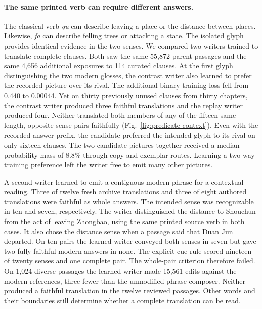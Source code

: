\paragraph{The same printed verb can require different answers.}
The classical verb \emph{qu} can describe leaving a place or the distance between places. Likewise, \emph{fa} can describe felling trees or attacking a state. The isolated glyph provides identical evidence in the two senses. We compared two writers trained to translate complete clauses. Both saw the same 55,872 parent passages and the same 4,656 additional exposures to 114 curated clauses. At the first glyph distinguishing the two modern glosses, the contrast writer also learned to prefer the recorded picture over its rival. The additional binary training loss fell from 0.440 to 0.00044. Yet on thirty previously unused clauses from thirty chapters, the contrast writer produced three faithful translations and the replay writer produced four. Neither translated both members of any of the fifteen same-length, opposite-sense pairs faithfully (Fig.~\ref{fig:predicate-context}). Even with the recorded answer prefix, the candidate preferred the intended glyph to its rival on only sixteen clauses. The two candidate pictures together received a median probability mass of 8.8\% through copy and exemplar routes. Learning a two-way training preference left the writer free to emit many other pictures.

A second writer learned to emit a contiguous modern phrase for a contextual reading. Three of twelve fresh archive translations and three of eight authored translations were faithful as whole answers. The intended sense was recognizable in ten and seven, respectively. The writer distinguished the distance to Shouchun from the act of leaving Zhongbao, using the same printed source verb in both cases. It also chose the distance sense when a passage said that Duan Jun departed. On ten pairs the learned writer conveyed both senses in seven but gave two fully faithful modern answers in none. The explicit cue rule scored nineteen of twenty senses and one complete pair. The whole-pair criterion therefore failed. On 1,024 diverse passages the learned writer made 15,561 edits against the modern references, three fewer than the unmodified phrase composer. Neither produced a faithful translation in the twelve reviewed passages. Other words and their boundaries still determine whether a complete translation can be read.
